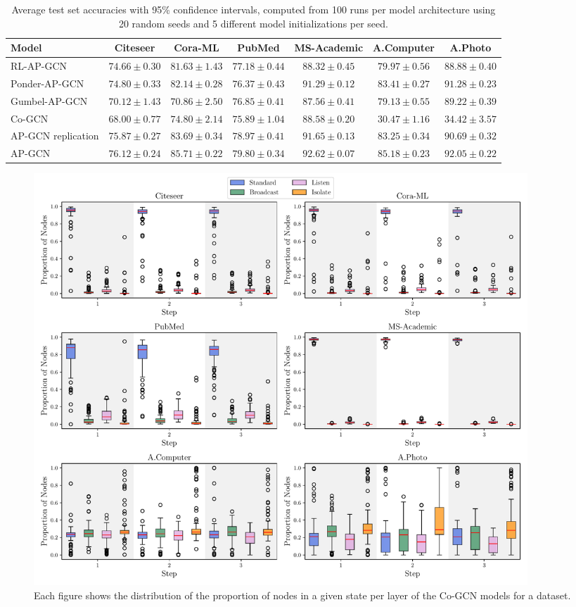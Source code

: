 \documentclass{gdl}
\begin{document}
\newpage
\onecolumn

\begin{table}[h]
    \small\sf\centering
    \caption{Average test set accuracies with 95\% confidence intervals, computed from 100 runs per model architecture using 20 random seeds and 5 different model initializations per seed.}
    \begin{tabular}{l c c c c c c}
        \toprule
        Model & Citeseer & Cora-ML & PubMed & MS-Academic & A.Computer & A.Photo\\
        \midrule
        RL-AP-GCN &$74.66 \pm 0.30$&$81.63 \pm 1.43$&$77.18 \pm 0.44$&$88.32 \pm 0.45$&$79.97 \pm 0.56$&$88.88 \pm 0.40$   \\
        Ponder-AP-GCN &$74.80 \pm 0.33$&$82.14 \pm 0.28$&$76.37 \pm 0.43$&$91.29 \pm 0.12$&$83.41 \pm 0.27$&$91.28 \pm 0.23$  \\
        Gumbel-AP-GCN &$70.12 \pm 1.43$&$70.86 \pm 2.50$&$76.85 \pm 0.41$&$87.56 \pm 0.41$&$79.13 \pm 0.55$&$89.22 \pm 0.39$  \\
        Co-GCN &$68.00 \pm 0.77$&$74.80 \pm 2.14$&$75.89 \pm 1.04$&$88.58 \pm 0.20$&$30.47 \pm 1.16$&$34.42 \pm 3.57$  \\
        AP-GCN replication &$75.87 \pm 0.27$&$83.69 \pm 0.34$&$78.97 \pm 0.41$&$91.65 \pm 0.13$&$83.25 \pm 0.34$&$90.69 \pm 0.32$        \\
        \midrule
        AP-GCN & $76.12 \pm 0.24$ & $85.71 \pm 0.22$ & $79.80 \pm 0.34$ & $92.62 \pm 0.07$ & $85.18 \pm 0.23$ & $92.05 \pm 0.22$\\
        \bottomrule
    \end{tabular}
    \label{tab:accuracy}
\end{table}

\begin{figure}[h]
    \centering 
        \includegraphics[width=0.9\textwidth]{Cooperative-AP-GCN_state_distribution_per_step.pdf}
        \caption{Each figure shows the distribution of the proportion of nodes in a given state per layer of the Co-GCN models for a dataset.}
        \label{fig:cooperative-result} 
\end{figure}
\end{document}
